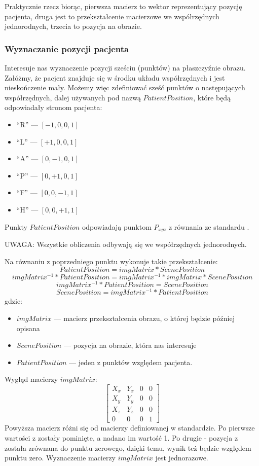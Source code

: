 Praktycznie rzecz biorąc, pierwsza macierz to wektor reprezentujący pozycję pacjenta, druga jest to przekształcenie macierzowe we współrzędnych jednorodnych, trzecia to pozycja na obrazie.

\subsubsection{Wyznaczanie pozycji pacjenta}

Interesuje nas wyznaczenie pozycji sześciu (punktów) na płaszczyźnie obrazu.
Załóżmy, że pacjent znajduje się w środku układu współrzędnych i jest nieskończenie mały.
Możemy więc zdefiniować sześć punktów o następujących współrzędnych, dalej używanych pod nazwą $PatientPosition$, które będą odpowiadały stronom pacjenta:
\begin{itemize}
    \item \enquote{R} --- $[-1, 0, 0, 1]$
    \item \enquote{L} --- $[+1, 0, 0, 1]$
    \item \enquote{A} --- $[0, -1, 0, 1]$
    \item \enquote{P} --- $[0, +1, 0, 1]$
    \item \enquote{F} --- $[0, 0, -1, 1]$
    \item \enquote{H} --- $[0, 0, +1, 1]$
\end{itemize}
Punkty $PatientPosition$ odpowiadają punktom $P_{xyz}$ z równania ze standardu \DICOM.

\par
UWAGA: Wszystkie obliczenia odbywają się we współrzędnych jednorodnych.

\par
Na równaniu z poprzedniego punktu wykonuje takie przekształcenie:
\[PatientPosition = imgMatrix * ScenePosition\]
\[imgMatrix^{-1} * PatientPosition = imgMatrix^{-1} * imgMatrix * ScenePosition\]
\[imgMatrix^{-1} * PatientPosition = ScenePosition\]
\[ScenePosition = imgMatrix^{-1} * PatientPosition\]
gdzie:
\begin{itemize}
    \item $imgMatrix$ --- macierz przekształcenia obrazu, o której będzie później opisana
    \item $ScenePosition$ --- pozycja na obrazie, która nas interesuje
    \item $PatientPosition$ --- jeden z punktów względem pacjenta.
\end{itemize}
\par
Wygląd macierzy $imgMatrix$:
\[
    \begin{bmatrix}
        X_x & Y_x & 0 & 0 \\
        X_y & Y_y & 0 & 0 \\
        X_z & Y_z & 0 & 0 \\
        0   & 0   & 0 & 1
    \end{bmatrix}
\]
Powyższa macierz różni się od macierzy definiowanej w standardzie.
Po pierwsze wartości z  zostały pominięte, a nadano im wartość 1.
Po drugie - pozycja z  została zrównana do punktu zerowego, dzięki temu, wynik też będzie względem punktu zero.
Wyznaczenie macierzy $imgMatrix$ jest jednorazowe.

